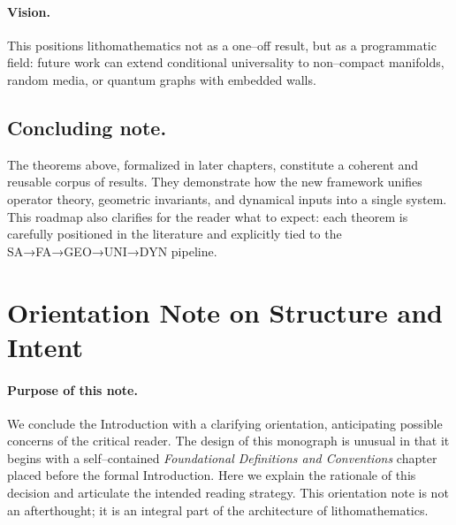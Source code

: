 \paragraph{Vision.}
This positions lithomathematics not as a one–off result, 
but as a programmatic field: 
future work can extend conditional universality to 
non–compact manifolds, random media, or quantum graphs with embedded walls.

\subsection{Concluding note.}
The theorems above, formalized in later chapters, 
constitute a coherent and reusable corpus of results. 
They demonstrate how the new framework unifies operator theory, 
geometric invariants, and dynamical inputs into a single system. 
This roadmap also clarifies for the reader what to expect: 
each theorem is carefully positioned in the literature 
and explicitly tied to the SA→FA→GEO→UNI→DYN pipeline.


\section*{Orientation Note on Structure and Intent}

\paragraph{Purpose of this note.}
We conclude the Introduction with a clarifying orientation, 
anticipating possible concerns of the critical reader. 
The design of this monograph is unusual in that it begins with 
a self–contained \emph{Foundational Definitions and Conventions} chapter 
placed before the formal Introduction. 
Here we explain the rationale of this decision and articulate 
the intended reading strategy. 
This orientation note is not an afterthought; it is an integral part of 
the architecture of lithomathematics. 

